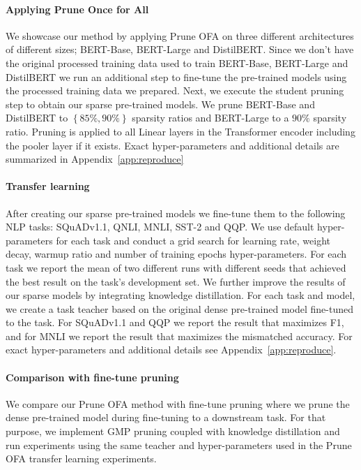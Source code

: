 \documentclass{article}
\begin{document}
\paragraph{Applying Prune Once for All}
\label{sec:apply-pofa}
We showcase our method by applying Prune OFA on three different architectures of different sizes; BERT-Base, BERT-Large and DistilBERT.
Since we don't have the original processed training data used to train BERT-Base, BERT-Large and DistilBERT we run an additional step to fine-tune the pre-trained models using the processed training data we prepared.
Next, we execute the student pruning step to obtain our sparse pre-trained models.
We prune BERT-Base and DistilBERT to $\left\{85\%, 90\%\right\}$ sparsity ratios and BERT-Large to a $90\%$ sparsity ratio.
Pruning is applied to all Linear layers in the Transformer encoder including the pooler layer if it exists.
Exact hyper-parameters and additional details are summarized in Appendix~\ref{app:reproduce}

\paragraph{Transfer learning}
After creating our sparse pre-trained models we fine-tune them to the following NLP tasks: SQuADv1.1, QNLI, MNLI, SST-2 and QQP.
We use default hyper-parameters for each task and conduct a grid search for learning rate, weight decay, warmup ratio and number of training epochs hyper-parameters.
For each task we report the mean of two different runs with different seeds that achieved the best result on the task's development set.
We further improve the results of our sparse models by integrating knowledge distillation.
For each task and model, we create a task teacher based on the original dense pre-trained model fine-tuned to the task.
For SQuADv1.1 and QQP we report the result that maximizes F1, and for MNLI we report the result that maximizes the mismatched accuracy.
For exact hyper-parameters and additional details see Appendix~\ref{app:reproduce}.

\paragraph{Comparison with fine-tune pruning}
We compare our Prune OFA method with fine-tune pruning where we prune the dense pre-trained model during fine-tuning to a downstream task. 
For that purpose, we implement GMP pruning coupled with knowledge distillation and run experiments using the same teacher and hyper-parameters used in the Prune OFA transfer learning experiments.
\end{document}
